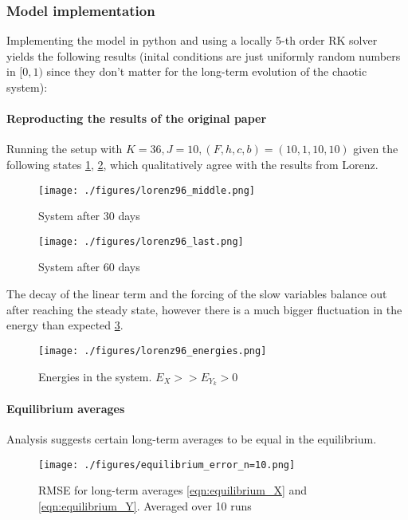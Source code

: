 \documentclass[11pt]{article}
\begin{document}
\subsubsection{Model implementation}
\label{sec:org7a7f065}
Implementing the model in python and using a locally 5-th order RK solver yields the following
results (inital conditions are just uniformly random numbers in \([0,1)\) since they don't matter
for the long-term evolution of the chaotic system):

\paragraph{Reproducting the results of the original paper}
\label{sec:orgf3652d8}
Running the setup with \(K=36, J=10, (F, h, c, b) = (10, 1, 10, 10)\) given the following states
\ref{fig:state_lorenz_30}, \ref{fig:state_lorenz_60},
which qualitatively agree with the results from Lorenz.

\begin{figure}[htbp]
\centering
\texttt{[image: ./figures/lorenz96\_middle.png]}
\caption{\label{fig:state_lorenz_30}
System after 30 days}
\end{figure}

\begin{figure}[htbp]
\centering
\texttt{[image: ./figures/lorenz96\_last.png]}
\caption{\label{fig:state_lorenz_60}
System after 60 days}
\end{figure}

The decay of the linear term and the forcing of the slow variables balance out after reaching the
steady state, however there is a much bigger fluctuation in the energy than expected \ref{fig:lorenz_energy}.

\begin{figure}[htbp]
\centering
\texttt{[image: ./figures/lorenz96\_energies.png]}
\caption{\label{fig:lorenz_energy}
Energies in the system. \(E_X >> E_{Y_k} > 0\)}
\end{figure}

\paragraph{Equilibrium averages}
\label{sec:org098e01c}
Analysis suggests certain long-term averages to be equal in the equilibrium.

\begin{figure}[htbp]
\centering
\texttt{[image: ./figures/equilibrium\_error\_n=10.png]}
\caption{\label{fig:lorenz_rmse}
RMSE for long-term averages \ref{eqn:equilibrium_X} and \ref{eqn:equilibrium_Y}. Averaged over 10 runs}
\end{figure}



\end{document}
